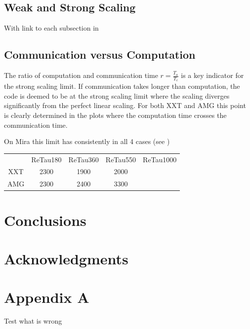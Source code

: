 \documentclass{sig-alternate}
\begin{document}
\subsection{Weak and Strong Scaling}
With link to each subsection in 


\subsection{Communication versus Computation}
The ratio of computation and communication time $r=\frac{T_a}{T_c}$ is a key
indicator for the strong scaling limit. If communication takes longer than
computation, the code is deemed to be at the strong scaling limit where the
scaling diverges significantly from the perfect linear scaling. For both XXT and
AMG this point is clearly determined in the plots where the computation time
crosses the communication time. 

On Mira this limit has consistently in all 4 cases (see
) 
\begin{tabular}{ccccc}
  &ReTau180&ReTau360&ReTau550&ReTau1000\\
  XXT&2300&1900&2000&\\
  AMG&2300&2400&3300&\\
\end{tabular}





\section{Conclusions}

\section{Acknowledgments}

%

%
%
\appendix
\section{Appendix A}
\label{sec:plots}

Test what is wrong
\end{document}
